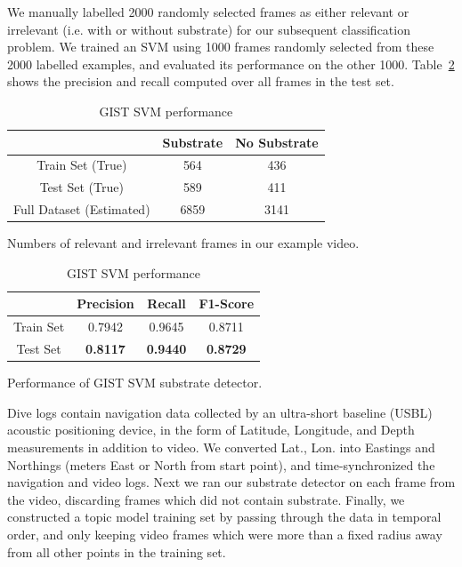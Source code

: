 We manually labelled 2000 randomly selected frames as either relevant or irrelevant (i.e. with or without substrate) for our subsequent classification problem. We trained an SVM using 1000 frames randomly selected from these 2000 labelled examples, and evaluated its performance on the other 1000. Table~\ref{tab:GIST-svm-performance} shows the precision and recall computed over all frames in the test set.

\begin{table}[t]
    \begin{center}
      \begin{tabular}{|c|cc|}
      \hline
         & Substrate & No Substrate \\
        \hline\hline
        Train Set (True)         & 564  & 436 \\
        Test Set (True)          & 589  & 411 \\
        Full Dataset (Estimated) & 6859 & 3141\\
        \hline
      \end{tabular}
      \caption{Numbers of relevant and irrelevant frames in our example video.}
      \label{tab:detection-statistics}
    \end{center}

    \begin{center}
      \begin{tabular}{|c|ccc|}
        \hline
         & Precision & Recall & F1-Score\\
        \hline\hline
        Train Set & 0.7942 & 0.9645 & 0.8711\\
        Test Set  & \textbf{0.8117} & \textbf{0.9440} & \textbf{0.8729}\\
        \hline
      \end{tabular}
      \caption{Performance of GIST SVM substrate detector.}
      \label{tab:GIST-svm-performance} 
    \end{center}
  \caption{GIST SVM performance}   
\end{table}

Dive logs contain navigation data collected by an ultra-short baseline (USBL) acoustic positioning device, in the form of Latitude, Longitude, and Depth measurements in addition to video. We converted Lat., Lon. into Eastings and Northings (meters East or North from start point), and time-synchronized the navigation and video logs. Next we ran our substrate detector on each frame from the video, discarding frames which did not contain substrate. Finally, we constructed a topic model training set by passing through the data in temporal order, and only keeping video frames which were more than a fixed radius away from all other points in the training set.

